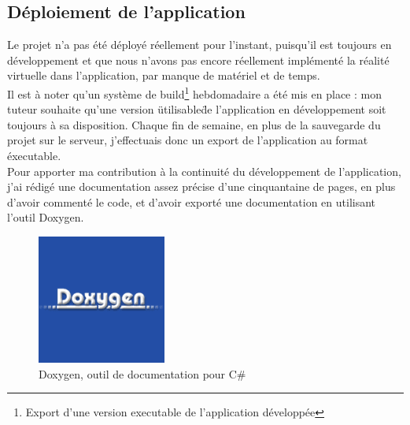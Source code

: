\documentclass[a4paper]{article}
\begin{document}
    \subsection{Déploiement de l'application}
   
    Le projet n'a pas été déployé réellement pour l'instant, puisqu'il est toujours en développement et que nous n'avons pas encore réellement implémenté la réalité virtuelle dans l'application, par manque de matériel et de temps. \\

    Il est à noter qu'un système de build\footnote{Export d'une version executable de l'application développée} hebdomadaire a été mis en place : mon tuteur souhaite qu'une version \"utilisable\" de l'application en développement soit toujours à sa disposition. Chaque fin de semaine, en plus de la sauvegarde du projet sur le serveur, j'effectuais donc un export de l'application au format éxecutable. \\
    
    Pour apporter ma contribution à la continuité du développement de l'application, j'ai rédigé une documentation assez précise d'une cinquantaine de pages, en plus d'avoir commenté le code, et d'avoir exporté une documentation en utilisant l'outil Doxygen. \\

    \begin{figure}[H]
        \centering
        \includegraphics{img/logo-doxygen}
        \caption{Doxygen, outil de documentation pour C\#}
    \end{figure}
\end{document}
